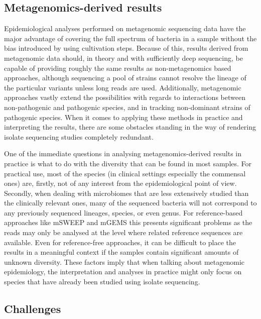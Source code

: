 \documentclass[officiallayout]{tktla}
\begin{document}
\subsection{Metagenomics-derived results}
Epidemiological analyses performed on metagenomic sequencing data have
the major advantage of covering the full spectrum of bacteria in a
sample without the bias introduced by using cultivation steps. Because
of this, results derived from metagenomic data should, in theory and
with sufficiently deep sequencing, be capable of providing roughly the
same results as non-metagenomics based approaches, although sequencing
a pool of strains cannot resolve the lineage of the particular
variants unless long reads are used. Additionally, metagenomic
approaches vastly extend the possibilities with regards to
interactions between non-pathogenic and pathogenic species, and in
tracking non-dominant strains of pathogenic species. When it comes to
applying these methods in practice and interpreting the results, there
are some obstacles standing in the way of rendering isolate sequencing
studies completely redundant.

One of the immediate questions in analysing metagenomics-derived
results in practice is what to do with the diversity that can be found
in most samples. For practical use, most of the species (in clinical
settings especially the commensal ones) are, firstly, not of any
interest from the epidemiological point of view. Secondly, when
dealing with microbiomes that are less extensively studied than the
clinically relevant ones, many of the sequenced bacteria will not
correspond to any previously sequenced lineages, species, or even
genus. For reference-based approaches like mSWEEP and mGEMS this
presents significant problems as the reads may only be analysed at the
level where related reference sequences are available. Even for
reference-free approaches, it can be difficult to place the results in
a meaningful context if the samples contain significant amounts of
unknown diversity. These factors imply that when talking about
metagenomic epidemiology, the interpretation and analyses in practice
might only focus on species that have already been studied using
isolate sequencing.

\subsection{Challenges}
\end{document}
